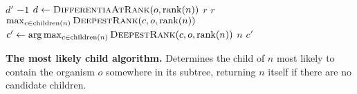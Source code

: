 \begin{algorithm}[h]
    \begin{algorithmic}[1]
    \small{
                    \Return $d'$
                \EndIf
            \EndFor
            \State \Return $-1$
        \EndFunction
            \State $d \gets \textsc{DifferentiaAtRank}(o, \operatorname{rank}(n))$
                \State \Return $r$
            \EndIf
                \State \Return $r$
            \EndIf
            \State \Return $\max_{c \in \operatorname{children}(n)} \textsc{DeepestRank}(c, o, \operatorname{rank}(n))$
        \EndFunction
            \State $c' \gets \arg\max_{c \in \operatorname{children}(n)} \textsc{DeepestRank}(c, o, \operatorname{rank}(n))$
                \State \Return $n$
            \EndIf
            \State \Return $c'$
        \EndFunction
    }
    \end{algorithmic}
    \caption{\textbf{The most likely child algorithm.} \small Determines the child of $n$ most likely to contain the organism $o$ somewhere in its subtree, returning $n$ itself if there are no candidate children. \vspace{-1.5em}}
    \label{alg:mostlikely}
\end{algorithm}
